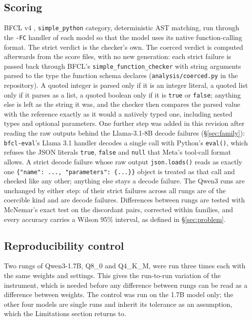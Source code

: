\documentclass[12pt,letterpaper]{article}
\newcommand{\bfcl}{BFCL}
\newcommand{\qm}{Qwen3-1.7B}
\begin{document}
\subsection{Scoring}
\label{sec:scoring}
\bfcl{} v4 \citep{bfcl2025}, \texttt{simple\_python} category, deterministic AST matching, run through the \texttt{-FC} handler of each model so that the model uses its native function-calling format. The strict verdict is the checker's own. The coerced verdict is computed afterwards from the score files, with no new generation: each strict failure is passed back through \bfcl{}'s \texttt{simple\_function\_checker} with string arguments parsed to the type the function schema declares (\texttt{analysis/coerced.py} in the repository). A quoted integer is parsed only if it is an integer literal, a quoted list only if it parses as a list, a quoted boolean only if it is \texttt{true} or \texttt{false}; anything else is left as the string it was, and the checker then compares the parsed value with the reference exactly as it would a natively typed one, including nested types and optional parameters. One further step was added in this revision after reading the raw outputs behind the Llama-3.1-8B decode failures (\S\ref{sec:family}): \texttt{bfcl-eval}'s Llama 3.1 handler decodes a single call with Python's \texttt{eval()}, which refuses the JSON literals \texttt{true}, \texttt{false} and \texttt{null} that Meta's tool-call format allows. A strict decode failure whose raw output \texttt{json.loads()} reads as exactly one \texttt{\{"name": ..., "parameters": \{...\}\}} object is treated as that call and checked like any other; anything else stays a decode failure. The Qwen3 runs are unchanged by either step: \qtCoercibleQwenTotal{} of their \qtFailsQwenTotal{} strict failures across all rungs are of the coercible kind and \qtDecodeQwenTotal{} are decode failures. Differences between rungs are tested with McNemar's exact test on the discordant pairs, corrected within families, and every accuracy carries a Wilson 95\% interval, as defined in \S\ref{sec:problem}.

\subsection{Reproducibility control}
\label{sec:repro-method}
Two rungs of \qm{}, Q8\_0 and Q4\_K\_M, were run three times each with the same weights and settings. This gives the run-to-run variation of the instrument, which is needed before any difference between rungs can be read as a difference between weights. The control was run on the 1.7B model only; the other four models are single runs and inherit its tolerance as an assumption, which the Limitations section returns to.
\end{document}
